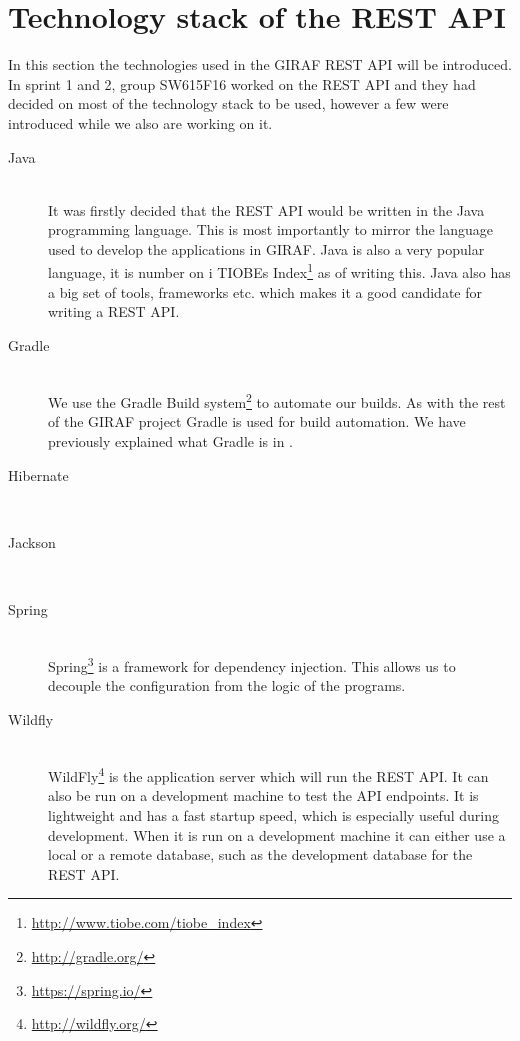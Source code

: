 

\section{Technology stack of the REST API}
In this section the technologies used in the GIRAF REST API will be introduced.
In sprint 1 and 2, group SW615F16 worked on the REST API and they had decided on most of the technology stack to be used, however a few were introduced while we also are working on it. 

\begin{description}
    \item[Java] \hfill \\
        It was firstly decided that the REST API would be written in the Java programming language.
        This is most importantly to mirror the language used to develop the applications in GIRAF.
        Java is also a very popular language, it is number on i TIOBEs Index\footnote{\url{http://www.tiobe.com/tiobe_index}} as of writing this.  
        Java also has a big set of tools, frameworks etc. which makes it a good candidate for writing a REST API.

    \item[Gradle] \hfill \\
        We use the Gradle Build system\footnote{\url{http://gradle.org/}} to automate our builds. 
        As with the rest of the GIRAF project Gradle is used for build automation. 
        We have previously explained what Gradle is in .

    \item[Hibernate] \hfill \\

    \item[Jackson] \hfill \\

    \item[Spring] \hfill \\ 
        Spring\footnote{\url{https://spring.io/}} is a framework for dependency injection. 
        This allows us to decouple the configuration from the logic of the programs. 

    \item[Wildfly] \hfill \\
        WildFly\footnote{\url{http://wildfly.org/}} is the application server which will run the REST API. 
        It can also be run on a development machine to test the API endpoints. 
        It is lightweight and has a fast startup speed, which is especially useful during development. 
        When it is run on a development machine it can either use a local or a remote database, such as the development database for the REST API. 


\end{description}

